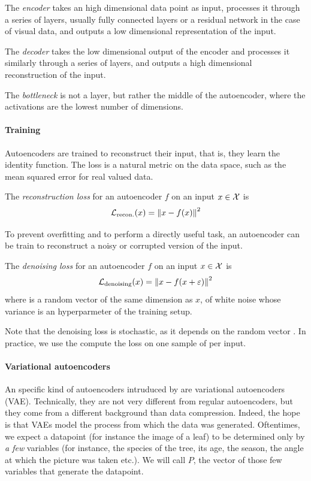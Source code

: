 \documentclass[]{scrarticle}
\begin{document}
The \emph{encoder} takes an high dimensional data point as input,
processes it through a series of layers, usually fully connected layers
or a residual network \cite{He2015DeepRL} in the case of visual data,
and outputs a low dimensional representation of the input.

The \emph{decoder} takes the low dimensional output of the encoder and
processes it similarly through a series of layers,
and outputs a high dimensional reconstruction of the input.

The \emph{bottleneck} is not a layer, but rather the middle of the autoencoder,
where the activations are the lowest number of dimensions.

\paragraph{Training}
Autoencoders are trained to reconstruct their input,
that is, they learn the identity function. The loss is a natural metric
on the data space, such as the mean squared error for real valued data.

\begin{definition}
  The \emph{reconstruction loss} for an autoencoder $f$ on an input $x \in \mathcal X$
  is
  \[
    \mathcal L_{\text{recon.}}(x) = \left\| x - f(x) \right\|^2
  \]
\end{definition}

To prevent overfitting and to perform a directly useful task,
an autoencoder can be train to reconstruct a noisy or corrupted
version of the input.
\begin{definition}
  The \emph{denoising loss} for an autoencoder $f$ on an input $x \in \mathcal X$ is
  \[
    \mathcal L_{\text{denoising}}(x) = \left\| x - f(x + \varepsilon) \right\|^2
  \]
  where \e is a random vector of the same dimension as $x$, of white noise
  whose variance is an hyperparmeter of the training setup.

  Note that the denoising loss is stochastic, as it depends on the random
  vector \e. In practice, we use the compute the loss on one sample of \e
  per input.
\end{definition}

\paragraph{Variational autoencoders}
An specific kind of autoencoders intruduced by 
are variational autoencoders (VAE).
Technically, they are not very different from regular autoencoders,
but they come from a different background than data compression.
Indeed, the hope is that VAEs model the process from which the data was generated.
Oftentimes, we expect a datapoint (for instance the image of a leaf) to be determined
only by \textit{a few} variables (for instance, the species of the tree, its age,
the season, the angle at which the picture was taken etc.).
We will call $P$, the vector of those few variables that generate the datapoint.
\end{document}
